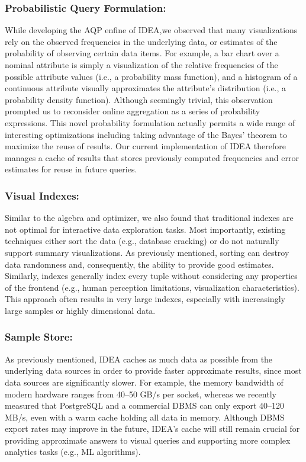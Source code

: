 \documentclass[12pt,letterpaper, onecolumn]{exam}
\begin{document}
    \subsubsection{Probabilistic Query Formulation:} While developing the AQP enfine of IDEA,we observed that many visualizations rely on the observed frequencies in the underlying data, or estimates of the probability of observing certain data items. For example, a bar chart over a nominal attribute is simply a visualization of the relative frequencies of the possible attribute values (i.e., a probability mass function), and a histogram of a continuous attribute visually approximates the attribute’s distribution (i.e., a probability density function). Although seemingly trivial, this observation prompted us to reconsider online aggregation as a series of probability expressions. This novel probability formulation actually permits a wide range of interesting optimizations including taking advantage of the Bayes’ theorem to maximize the reuse of results. Our current implementation of IDEA therefore manages a cache of results that stores previously computed frequencies and error estimates for reuse in future queries.

    \subsubsection{Visual Indexes:} Similar to the algebra and optimizer, we also found that traditional indexes are not optimal for interactive data exploration tasks. Most importantly, existing techniques either sort the data (e.g., database cracking) or do not naturally support summary visualizations. As previously mentioned, sorting can destroy data randomness and, consequently, the ability to provide good estimates. Similarly, indexes generally index every tuple without considering any properties of the frontend (e.g., human perception limitations, visualization characteristics). This approach often results in very large indexes, especially with increasingly large samples or highly dimensional data.

    \subsubsection{Sample Store:} As previously mentioned, IDEA caches as much data as possible from the underlying data sources in order to provide faster approximate results, since most data sources are significantly slower. For example, the memory bandwidth of modern hardware ranges from 40–50 GB/s per socket, whereas we recently measured that PostgreSQL and a commercial DBMS can only export 40–120 MB/s, even with a warm cache holding all data in memory. Although DBMS export rates may improve in the future, IDEA’s cache will still remain crucial for providing approximate answers to visual queries and supporting more complex analytics tasks (e.g., ML algorithms). 
\end{document}
